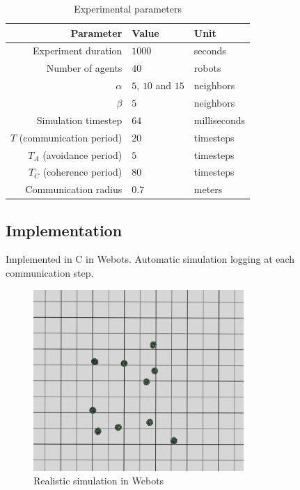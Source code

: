 \documentclass[a4paper, 10pt, conference]{ieeeconf}
\begin{document}
  \begin{table}[h]
    \begin{center}
      \begin{tabular}{r|ll}
        \hline
        Parameter                  & Value               & Unit\\
        \hline
        Experiment duration        & $1000$              & seconds\\
        Number of agents           & $40$                & robots\\
        $\alpha$                   & $5$, $10$ and $15$  & neighbors\\
        $\beta$                    & $5$                 & neighbors\\
        Simulation timestep        & $64$                & milliseconds\\
        $T$ (communication period) & $20$                & timesteps\\
        $T_A$ (avoidance period)   & $5$                 & timesteps\\
        $T_C$ (coherence period)   & $80$                & timesteps\\
        Communication radius       & $0.7$               & meters\\
        \hline
      \end{tabular}
      \caption{Experimental parameters}
    \end{center}
  \end{table}

  \subsection{Implementation}
  Implemented in C in Webots. Automatic simulation logging at each communication step.\\

  \begin{figure}[h]
    \begin{center}
      \includegraphics[width=8cm]{figures/swarm-10-screenshot.png}
      \caption{Realistic simulation in Webots}
    \end{center}
  \end{figure}
\end{document}
